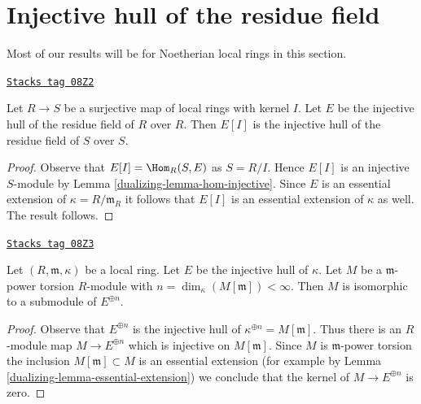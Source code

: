 \section{Injective hull of the residue field}
\label{dualizing-section-hull-residue-field}
Most of our results will be for Noetherian local rings in this section.

\begin{lemma}[Quotient]
\label{dualizing-lemma-quotient}
\href{https://stacks.math.columbia.edu/tag/08Z2}{\texttt{Stacks tag 08Z2}}

Let $R \to S$ be a surjective map of local rings with kernel $I$.
Let $E$ be the injective hull of the residue field of $R$ over $R$.
Then $E[I]$ is the injective hull of the residue field of $S$ over $S$.
\end{lemma}

\begin{proof}

Observe that $E[I] = \Hom_R(S, E)$ as $S = R/I$. Hence $E[I]$ is an injective
$S$-module by Lemma \ref{dualizing-lemma-hom-injective}. Since $E$ is an essential
extension of $\kappa = R/\mathfrak m_R$ it follows that $E[I]$ is an
essential extension of $\kappa$ as well. The result follows.
\end{proof}

\begin{lemma}
\label{dualizing-lemma-torsion-submodule-sum-injective-hulls}
\href{https://stacks.math.columbia.edu/tag/08Z3}{\texttt{Stacks tag 08Z3}}

Let $(R, \mathfrak m, \kappa)$ be a local ring.
Let $E$ be the injective hull of $\kappa$.
Let $M$ be a $\mathfrak m$-power torsion $R$-module
with $n = \dim_\kappa(M[\mathfrak m]) < \infty$.
Then $M$ is isomorphic to a submodule of $E^{\oplus n}$.
\end{lemma}

\begin{proof}

Observe that $E^{\oplus n}$ is the injective hull of
$\kappa^{\oplus n} = M[\mathfrak m]$. Thus there is an $R$-module map
$M \to E^{\oplus n}$ which is injective on $M[\mathfrak m]$.
Since $M$ is $\mathfrak m$-power torsion the inclusion
$M[\mathfrak m] \subset M$ is an essential extension
(for example by Lemma \ref{dualizing-lemma-essential-extension})
we conclude that the kernel of $M \to E^{\oplus n}$ is zero.
\end{proof}

